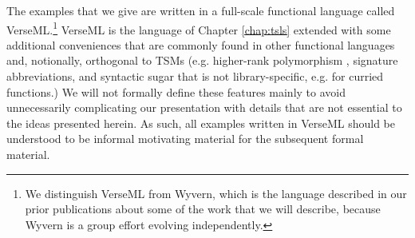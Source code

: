 
The examples that we give are written in a full-scale functional language called VerseML.\footnote{We distinguish VerseML from Wyvern, which is the language described in our prior publications about some of the work that we will describe, because Wyvern is a group effort evolving independently.} VerseML is the language of Chapter \ref{chap:tsls}  extended with some additional conveniences that are commonly found in other functional languages and, notionally, orthogonal to TSMs (e.g. higher-rank polymorphism \cite{conf/icfp/DunfieldK13}, signature abbreviations, and syntactic sugar that is not library-specific, e.g. for curried functions.) %
We will not formally define these features mainly to avoid unnecessarily complicating our presentation with details that are not essential to the ideas presented herein. As such, all examples written in VerseML should be understood to be informal motivating material for the subsequent formal material. %

